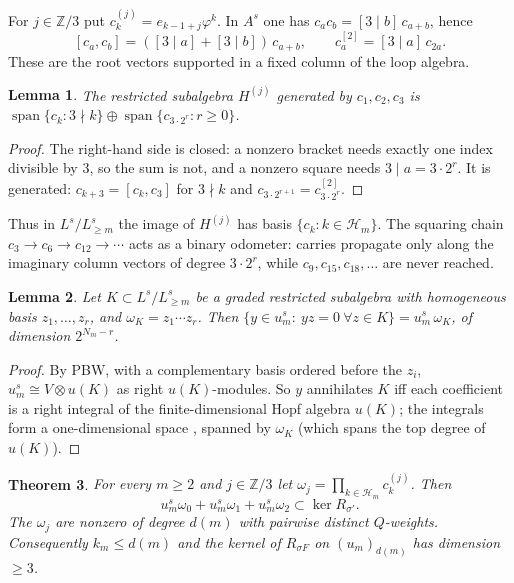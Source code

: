 \documentclass[11pt]{amsart}
\newtheorem{theorem}{Theorem}[section]
\newtheorem{lemma}[theorem]{Lemma}
\theoremstyle{definition}
\newcommand{\Z}{\mathbb{Z}}
\newcommand{\Hcal}{\mathcal H}
\begin{document}
For $j\in\Z/3$ put $c^{(j)}_k=e_{k-1+j}\varphi^k$. In $A^s$ one has $c_ac_b=[3\mid b]\,c_{a+b}$, hence
\[
  [c_a,c_b]=([3\mid a]+[3\mid b])\,c_{a+b},\qquad c_a^{[2]}=[3\mid a]\,c_{2a}.
\]
These are the root vectors supported in a fixed column of the loop algebra.

\begin{lemma}\label{lem:H}
The restricted subalgebra $H^{(j)}$ generated by $c_1,c_2,c_3$ is $\operatorname{span}\{c_k:3\nmid k\}\oplus\operatorname{span}\{c_{3\cdot2^r}:r\ge0\}$.
\end{lemma}

\begin{proof}
The right-hand side is closed: a nonzero bracket needs exactly one index divisible by $3$, so the sum is not, and a
nonzero square needs $3\mid a=3\cdot2^r$. It is generated: $c_{k+3}=[c_k,c_3]$ for $3\nmid k$ and
$c_{3\cdot2^{r+1}}=c_{3\cdot2^r}^{[2]}$.
\end{proof}

Thus in $L^s/L^s_{\ge m}$ the image of $H^{(j)}$ has basis $\{c_k:k\in\Hcal_m\}$. The squaring chain
$c_3\to c_6\to c_{12}\to\cdots$ acts as a binary odometer: carries propagate only along the imaginary column
vectors of degree $3\cdot 2^r$, while $c_9,c_{15},c_{18},\dots$ are never reached.

\begin{lemma}\label{lem:integral}
Let $K\subset L^s/L^s_{\ge m}$ be a graded restricted subalgebra with homogeneous basis $z_1,\dots,z_r$, and
$\omega_K=z_1\cdots z_r$. Then $\{y\in u^s_m:\ yz=0\ \forall z\in K\}=u^s_m\,\omega_K$, of dimension $2^{N_m-r}$.
\end{lemma}

\begin{proof}
By PBW, with a complementary basis ordered before the $z_i$, $u^s_m\cong V\otimes u(K)$ as right $u(K)$-modules.
So $y$ annihilates $K$ iff each coefficient is a right integral of the finite-dimensional Hopf algebra $u(K)$;
the integrals form a one-dimensional space \cite{LarsonSweedler}, spanned by $\omega_K$ (which spans the top
degree of $u(K)$).
\end{proof}

\begin{theorem}\label{thm:kernel}
For every $m\ge2$ and $j\in\Z/3$ let $\omega_j=\prod_{k\in\Hcal_m}c^{(j)}_k$. Then
\[
  u^s_m\omega_0+u^s_m\omega_1+u^s_m\omega_2\subset\ker R_{\sigma'} .
\]
The $\omega_j$ are nonzero of degree $d(m)$ with pairwise distinct $Q$-weights. Consequently $k_m\le d(m)$ and the
kernel of $R_{\sigma F}$ on $(u_m)_{d(m)}$ has dimension $\ge3$.
\end{theorem}
\end{document}
